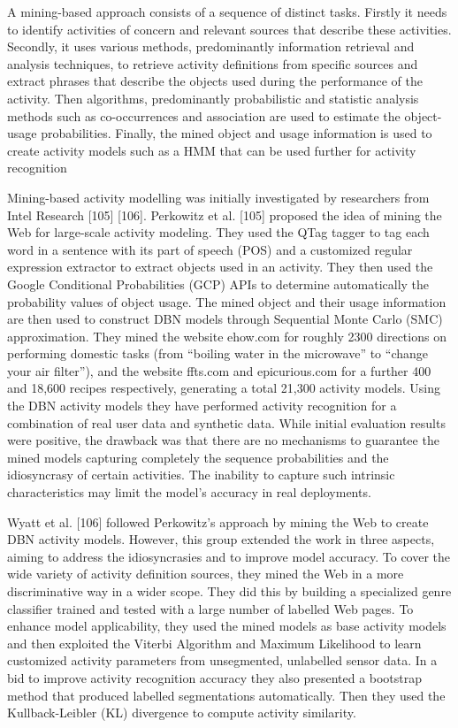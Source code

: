A mining-based approach consists of a sequence of distinct tasks. Firstly it needs to identify activities of concern and relevant sources that describe these activities. Secondly, it uses various methods, predominantly information retrieval and analysis techniques, to retrieve activity definitions from specific sources and extract phrases that describe the objects used during the performance of the activity. Then algorithms, predominantly probabilistic and statistic analysis methods such as co-occurrences and association are used to estimate the object-usage probabilities. Finally, the mined object and usage information is used to create activity models such as a HMM that can be used further for activity recognition

Mining-based activity modelling was initially investigated by researchers from Intel Research [105] [106]. Perkowitz et al. [105] proposed the idea of mining the Web for large-scale activity modeling. They used the QTag tagger to tag each word in a sentence with its part of speech (POS) and a customized regular expression extractor to extract objects used in an activity. They then used the Google Conditional Probabilities (GCP) APIs to determine automatically the probability values of object usage. The mined object and their usage information are then used to construct DBN models through Sequential Monte Carlo (SMC) approximation. They mined the website ehow.com for roughly 2300 directions on performing domestic tasks (from “boiling water in the microwave” to “change your air filter”), and the website ffts.com and epicurious.com for a further 400 and 18,600 recipes respectively, generating a total 21,300 activity models. Using the DBN activity models they have performed activity recognition for a combination of real user data and synthetic data. While initial evaluation results were positive, the drawback was that there are no mechanisms to guarantee the mined models capturing completely the sequence probabilities and the idiosyncrasy of certain activities. The inability to capture such intrinsic characteristics may limit the model's accuracy in real deployments.

Wyatt et al. [106] followed Perkowitz’s approach by mining the Web to create DBN activity models. However, this group extended the work in three aspects, aiming to address the idiosyncrasies and to improve model accuracy. To cover the wide variety of activity definition sources, they mined the Web in a more discriminative way in a wider scope. They did this by building a specialized genre classifier trained and tested with a large number of labelled Web pages. To enhance model applicability, they used the mined models as base activity models and then exploited the Viterbi Algorithm and Maximum Likelihood to learn customized activity parameters from unsegmented, unlabelled sensor data. In a bid to improve activity recognition accuracy they also presented a bootstrap method that produced labelled segmentations automatically. Then they used the Kullback-Leibler (KL) divergence to compute activity similarity.

